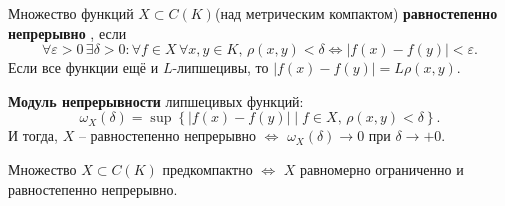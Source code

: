 \begin{to_def}
	Множество функций $X \subset C(K)$(над метрическим компактом) \textbf{равностепенно непрерывно} , если 
	\begin{equation*}
		\forall \varepsilon >0 \, \exists \delta > 0 \colon \forall f \in X\, \forall x, y \in K, \, \rho(x,y) < \delta \Leftrightarrow |f(x) - f(y)| < \varepsilon.
	\end{equation*}
	Если все функции ещё и $L$-липшецивы, то $|f(x) - f(y)| = L \rho(x,y)$.
\end{to_def}

\begin{to_def}
	\textbf{Модуль непрерывности} липшецивых функций:
	\begin{equation*}
		\omega_X(\delta) = \sup \left\{|f(x) - f(y)| \mid f \in X, \, \rho(x,y) < \delta \right\}.
	\end{equation*}
	И тогда,
	$X$ -- равностепенно непрерывно $\Longleftrightarrow$ $\omega_X(\delta) \to 0$ при $\delta \to +0$.
\end{to_def}


\begin{to_thr}
	Множество $X \subset C(K)$ предкомпактно $\Longleftrightarrow$ $X$ равномерно ограниченно и равностепенно непрерывно.
\end{to_thr}